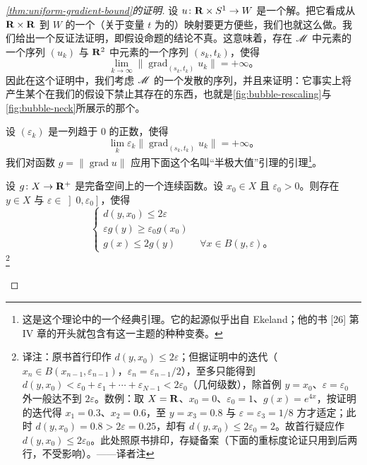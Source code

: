 \begin{proof}[\cref{thm:uniform-gradient-bound}的证明]
设 $u\colon\mathbf{R}\times S^1\to W$ 是一个解。把它看成从 $\mathbf{R}\times\mathbf{R}$ 到 $W$ 的一个（关于变量 $t$ 为\trPeriodic{}的）映射要更方便些，我们也就这么做。我们给出一个反证法证明，即假设命题的结论不真。这意味着，存在 $\mathscr{M}$ 中元素的一个序列 $(u_k)$ 与 $\mathbf{R}^2$ 中元素的一个序列 $(s_k,t_k)$，使得
\[
\lim_{k\to\infty}\bigl\|\operatorname{grad}_{(s_k,t_k)}u_k\bigr\|=+\infty\text{。}
\]
因此在这个证明中，我们考虑 $\mathscr{M}$ 的一个发散的序列，并且来证明：它事实上将产生某个在我们的假设下禁止其存在的东西，也就是\cref{fig:bubble-rescaling}与\cref{fig:bubble-neck}所展示的那个\trBubble。

设 $(\varepsilon_k)$ 是一列趋于 $0$ 的正数，使得
\[
\lim_k\varepsilon_k\bigl\|\operatorname{grad}_{(s_k,t_k)}u_k\bigr\|=+\infty\text{。}
\]
我们对函数 $g=\|\operatorname{grad}u\|$ 应用下面这个名叫“半极大值”引理的引理\footnote{这是这个理论中的一个经典引理。它的起源似乎出自 Ekeland；他的书 [26] 第 IV 章的开头就包含有这一主题的种种变奏。}。

\begin{lemma}\label{thm:half-maximum-lemma}
设 $g\colon X\to\mathbf{R}^+$ 是完备\trMetric{}空间上的一个连续函数。设 $x_0\in X$ 且 $\varepsilon_0>0$。则存在 $y\in X$ 与 $\varepsilon\in\left]0,\varepsilon_0\right]$，使得
\[
\left\{\begin{array}{l}
d(y,x_0)\le 2\varepsilon\\
\varepsilon g(y)\ge \varepsilon_0 g(x_0)\\
g(x)\le 2g(y)\qquad\ \ \forall x\in B(y,\varepsilon)\text{。}
\end{array}\right.
\]
\footnote{译注：原书首行印作 $d(y,x_0)\le 2\varepsilon$；但据证明中的迭代（$x_n\in B(x_{n-1},\varepsilon_{n-1})$，$\varepsilon_n=\varepsilon_{n-1}/2$），至多只能得到 $d(y,x_0)<\varepsilon_0+\varepsilon_1+\cdots+\varepsilon_{N-1}<2\varepsilon_0$（几何级数），除首例 $y=x_0$、$\varepsilon=\varepsilon_0$ 外一般达不到 $2\varepsilon$。数例：取 $X=\mathbf{R}$、$x_0=0$、$\varepsilon_0=1$、$g(x)=e^{4x}$，按证明的迭代得 $x_1=0.3$、$x_2=0.6$，至 $y=x_3=0.8$ 与 $\varepsilon=\varepsilon_3=1/8$ 方才适定；此时 $d(y,x_0)=0.8>2\varepsilon=0.25$，却有 $d(y,x_0)\le 2\varepsilon_0=2$。故首行疑应作 $d(y,x_0)\le 2\varepsilon_0$。此处照原书排印，存疑备案（下面的重标度论证只用到后两行，不受影响）。——译者注}
\end{lemma}


\end{proof}
